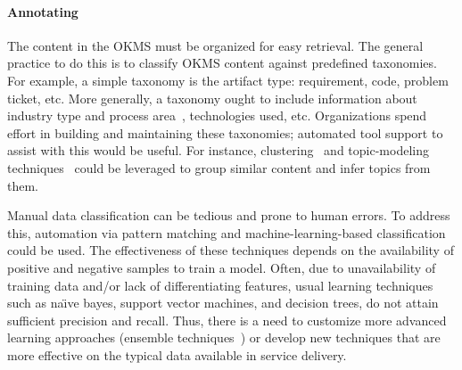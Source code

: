 \vskip -5pt
\paragraph*{Annotating}
The content in the OKMS must be organized for easy retrieval. The general
practice to do this is to classify OKMS content against predefined
taxonomies. For example, a simple taxonomy is the artifact type: requirement,
code, problem ticket, etc. More generally, a taxonomy ought to include
information about industry type and process area~\cite{apqc,bph}, technologies
used, etc. Organizations spend effort in building and maintaining these
taxonomies; automated tool support to assist with this would be useful. For
instance, clustering~\cite{Berkhin06} and topic-modeling
techniques~\cite{Blei:2012} could be leveraged to group similar content and
infer topics from them.

Manual data classification can be tedious and prone to human errors. To address
this, automation via pattern matching and machine-learning-based
classification~\cite{bishop2006pattern} could be used.  The effectiveness of
these techniques depends on the availability of positive and negative samples to
train a model. Often, due to unavailability of training data and/or lack of
differentiating features, usual learning techniques such as na\"{\i}ve bayes,
support vector machines, and decision trees, do not attain sufficient precision
and recall. Thus, there is a need to customize more advanced learning approaches
(\eg ensemble techniques~\cite{Dietterich:2000}) or develop new techniques that
are more effective on the typical data available in service delivery.



